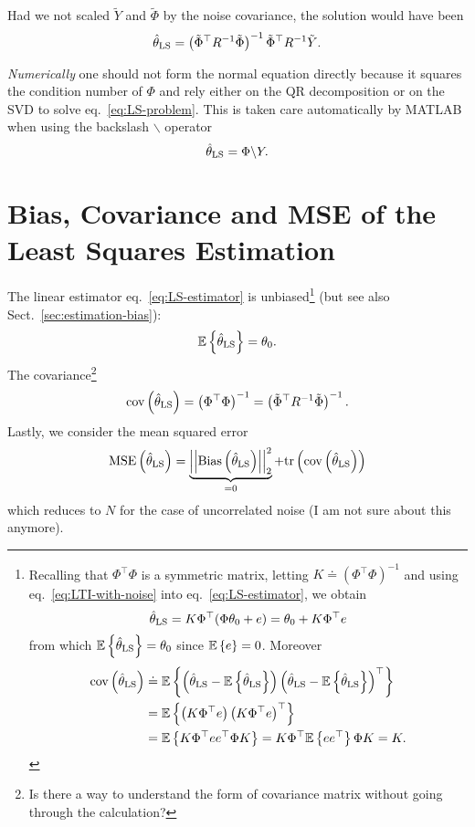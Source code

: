 Had we not scaled $\tilde{Y}$ and $\tilde{\Phi}$ by the noise covariance, the solution would have been
\begin{equation*}
  \hat{\theta}_\textrm{LS} = \left(\tilde{\Phi}^\top R^{-1}\tilde{\Phi}\right)^{-1} \tilde{\Phi}^\top R^{-1} \tilde{Y}.
\end{equation*}

\emph{Numerically} one should not form the normal equation directly because it squares the condition number of $\Phi$ and rely either on the QR decomposition or on the SVD to solve eq.~\eqref{eq:LS-problem}.
This is taken care automatically by MATLAB when using the backslash $\backslash$ operator
\begin{equation}
  \label{eq:LS-numerical-solution}
  \hat{\theta}_\textrm{LS} = \Phi \backslash Y.
\end{equation}

\section{Bias, Covariance and MSE of the Least Squares Estimation}
\label{sec:bias-variance-MSE-LS-estimation}

The linear estimator eq.~\eqref{eq:LS-estimator} is unbiased\footnote{Recalling that $\Phi^\top \Phi$ is a symmetric matrix, letting $K\doteq (\Phi^\top \Phi)^{-1}$ and using eq.~\eqref{eq:LTI-with-noise} into eq.~\eqref{eq:LS-estimator}, we obtain
  \begin{equation}
    \label{eq:thetaLS-estimate}
    \hat{\theta}_\textrm{LS} = K\Phi^\top (\Phi\theta_0 + e) = \theta_0 + K\Phi^\top e
  \end{equation}
  from which $\mathbb{E}\left\{\hat{\theta}_\textrm{LS}\right\} = \theta_0$ since $\mathbb{E}\left\{e\right\}=0$. Moreover
  \begin{align*}
    \textrm{cov}\left(\hat{\theta}_\textrm{LS}\right) &\doteq \mathbb{E}\left\{\left(\hat{\theta}_\textrm{LS} - \mathbb{E}\left\{\hat{\theta}_\textrm{LS}\right\}\right) \left(\hat{\theta}_\textrm{LS} - \mathbb{E}\left\{\hat{\theta}_\textrm{LS}\right\}\right)^\top\right\} \\
                   &= \mathbb{E}\left\{\left(K \Phi^\top e\right) \left(K \Phi^\top e\right)^\top\right\} \\
                   &= \mathbb{E}\left\{K \Phi^\top e e^\top \Phi K\right\} = K \Phi^\top \mathbb{E}\left\{ee^\top\right\} \Phi K = K.
  \end{align*}} (but see also Sect.~\ref{sec:estimation-bias}):
\begin{equation*}
  \mathbb{E}\left\{\hat{\theta}_\textrm{LS}\right\} = \theta_0.
\end{equation*}
The covariance\footnote{Is there a way to understand the form of covariance matrix without going through the calculation?}
\begin{equation}
  \label{eq:covariance-LS}
  \textrm{cov}\left(\hat{\theta}_\textrm{LS}\right) = \left(\Phi^\top \Phi\right)^{-1} = \left(\tilde{\Phi}^\top R^{-1} \tilde{\Phi}\right)^{-1}.
\end{equation}
Lastly, we consider the mean squared error
\begin{equation*}
  \textrm{MSE}\left(\hat{\theta}_\textrm{LS}\right) = \underbrace{\left|\left|\textrm{Bias}\left(\hat{\theta}_\textrm{LS}\right)\right|\right|_2^2}_{=0} + \textrm{tr}\left(\textrm{cov}\left(\hat{\theta}_\textrm{LS}\right)\right)
\end{equation*}
which reduces to $N$ for the case of uncorrelated noise (I am not sure about this anymore).

